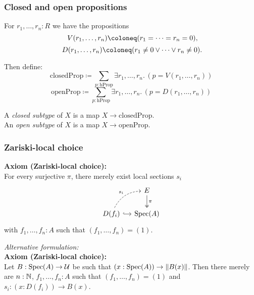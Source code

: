 \documentclass{beamer}
\begin{document}
\begin{frame}
  \frametitle{Closed and open propositions}

  For $r_1, \dots, r_n : R$ we have the propositions
  \[ V(r_1, \dots, r_n) \coloneq (r_1 = \dots = r_n = 0) \rlap{,}\]
  \[ D(r_1, \dots, r_n) \coloneq (r_1\neq 0\lor \dots \lor r_n\neq 0) \rlap{.}\]

  Then define:
  \[ \mathrm{closedProp} \coloneq
     \sum_{p : \mathrm{hProp}} \exists r_1, \dots, r_n.\, (p = V(r_1, \dots, r_n))
  \]
  \[ \mathrm{openProp} \coloneq
     \sum_{p : \mathrm{hProp}} \exists r_1, \dots, r_n.\, (p = D(r_1, \dots, r_n))
  \]

  \vspace{5mm}
  A \emph{closed subtype} of $X$
  is a map $X \to \mathrm{closedProp}$.\\
  An \emph{open subtype} of $X$
  is a map $X \to \mathrm{openProp}$.
\end{frame}

\begin{frame}
  \frametitle{Zariski-local choice}

  \vspace{2.5mm}
  \textbf{Axiom (Zariski-local choice):}\\
  For every surjective $\pi$, there merely exist local sections $s_i$
  \[ \begin{tikzcd}[ampersand replacement=\&, column sep=small]
    \& E \ar[d, two heads, "\pi"] \\
    D(f_i) \ar[r, hook] \ar[ur, bend left, dashed, "s_i"] \& \Spec(A)
  \end{tikzcd} \]
  with $f_1, \dots, f_n : A$ such that $(f_1,\dots,f_n)=(1)$.

  \vspace{0.4cm}
  \emph{Alternative formulation:} \\

  \textbf{Axiom (Zariski-local choice):}\\
  Let $B:\operatorname{Spec}(A)\to \mathcal U$ be such that $(x:\operatorname{Spec}(A))\to\|B(x)\|$.
  Then there merely are $n:\mathbb{N}$, $f_1, \dots, f_n : A$ such that $(f_1,\dots,f_n)=(1)$ and
  $s_i:(x:D(f_i))\to B(x)$.
\end{frame}
\end{document}
